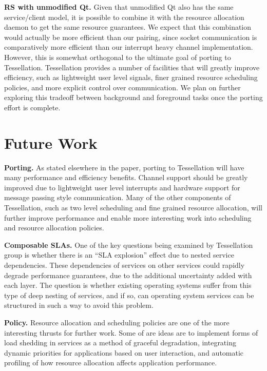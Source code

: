 \documentclass[letterpaper,twocolumn,11pt]{article}
\begin{document}
\textbf{RS with unmodified Qt.} Given that unmodified Qt also has the same service/client model, it is possible to combine it with the resource allocation daemon to get the same resource guarantees. We expect that this combination would actually be more efficient than our pairing, since socket communication is comparatively more efficient than our interrupt heavy channel implementation. However, this is somewhat orthogonal to the ultimate goal of porting to Tessellation. Tessellation provides a number of facilities that will greatly improve efficiency, such as lightweight user level signals, finer grained resource scheduling policies, and more explicit control over communication. We plan on further exploring this tradeoff between background and foreground tasks once the porting effort is complete.

\section{Future Work}

\textbf{Porting.} As stated elsewhere in the paper, porting to Tessellation will have many performance and efficiency benefits. Channel support should be greatly improved due to lightweight user level interrupts and hardware support for message passing style communication. Many of the other components of Tessellation, such as two level scheduling and fine grained resource allocation, will further improve performance and enable more interesting work into scheduling and resource allocation policies.

\textbf{Composable SLAs.} One of the key questions being examined by Tessellation group is whether there is an ``SLA explosion'' effect due to nested service dependencies. These dependencies of services on other services could rapidly degrade performance guarantees, due to the additional uncertainty added with each layer. The question is whether existing operating systems suffer from this type of deep nesting of services, and if so, can operating system services can be structured in such a way to avoid this problem.

\textbf{Policy.} Resource allocation and scheduling policies are one of the more interesting thrusts for further work. Some of are ideas are to implement forms of load shedding in services as a method of graceful degradation, integrating dynamic priorities for applications based on user interaction, and automatic profiling of how resource allocation affects application performance.
\end{document}
